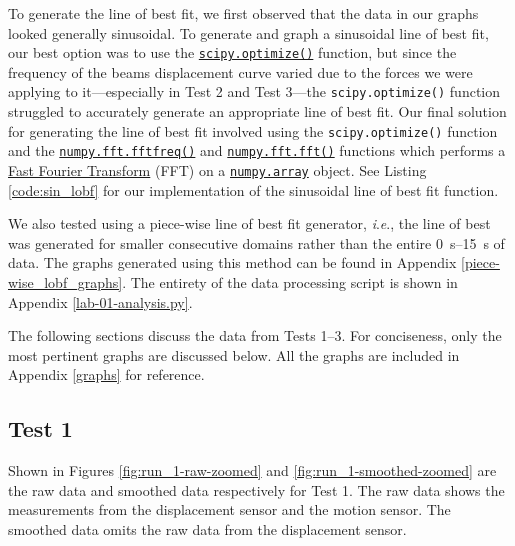 \documentclass[12 pt]{report}
\newcommand{\ie}{\textit{i}.\textit{e}., }
\begin{document}
To generate the line of best fit, we first observed that the data in our graphs looked generally sinusoidal. To generate and graph a sinusoidal line of best fit, our best option was to use the \href{https://docs.scipy.org/doc/scipy/tutorial/optimize.html}{\texttt{scipy.optimize()}} function, but since the frequency of the beams displacement curve varied due to the forces we were applying to it---especially in Test \num{2} and Test \num{3}---the \texttt{scipy.optimize()} function struggled to accurately generate an appropriate line of best fit. Our final solution for generating the line of best fit involved using the \texttt{scipy.optimize()} function and the \href{https://numpy.org/doc/stable/reference/generated/numpy.fft.fftfreq.html}{\texttt{numpy.fft.fftfreq()}} and \href{https://numpy.org/doc/stable/reference/generated/numpy.fft.fft.html}{\texttt{numpy.fft.fft()}} functions which performs a \href{https://en.wikipedia.org/wiki/Fast_Fourier_transform}{Fast Fourier Transform} (FFT) on a \href{https://numpy.org/doc/stable/reference/generated/numpy.array.html}{\texttt{numpy.array}} object. See Listing \ref{code:sin_lobf} for our implementation of the sinusoidal line of best fit function.

\vspace{5mm}



We also tested using a piece-wise line of best fit generator, \ie the line of best was generated for smaller consecutive domains rather than the entire \qtyrange{0}{15}{\s} of data. The graphs generated using this method can be found in Appendix \ref{piece-wise_lobf_graphs}. The entirety of the data processing script is shown in Appendix \ref{lab-01-analysis.py}.

The following sections discuss the data from Tests \num{1}--\num{3}. For conciseness, only the most pertinent graphs are discussed below. All the graphs are included in Appendix \ref{graphs} for reference.

\subsection{Test 1} \label{data-test_1}
Shown in Figures \ref{fig:run_1-raw-zoomed} and \ref{fig:run_1-smoothed-zoomed} are the raw data and smoothed data respectively for Test \num{1}. The raw data shows the measurements from the displacement sensor and the motion sensor. The smoothed data omits the raw data from the displacement sensor.
\end{document}
